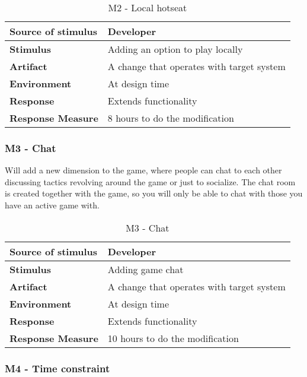 \begin{table}[h!]
\begin{tabular}{ | p{110pt} | p{250pt}  |}
\hline
\bf Source of stimulus &  Developer  \\ \hline
\bf Stimulus & Adding an option to play locally \\ \hline 
\bf Artifact & A change that operates with target system  \\  \hline
\bf Environment & At design time \\ \hline
\bf Response & Extends functionality \\ \hline
\bf Response Measure & 8 hours to do the modification \\ \hline

\end{tabular}
\caption{M2 - Local hotseat}
\end{table}

\subsubsection{M3 - Chat}

Will add a new dimension to the game, where people can chat to each other discussing tactics revolving around the game or just to socialize. The chat room is created together with the game, so you will only be able to chat with those you have an active game with.

\begin{table}[h!]
\begin{tabular}{ | p{110pt} | p{250pt}  |}
\hline
\bf Source of stimulus &  Developer  \\ \hline
\bf Stimulus & Adding game chat \\ \hline 
\bf Artifact & A change that operates with target system  \\  \hline
\bf Environment & At design time \\ \hline
\bf Response & Extends functionality \\ \hline
\bf Response Measure & 10 hours to do the modification \\ \hline

\end{tabular}
\caption{M3 - Chat}
\end{table}

\pagebreak

\subsubsection{M4 - Time constraint}

